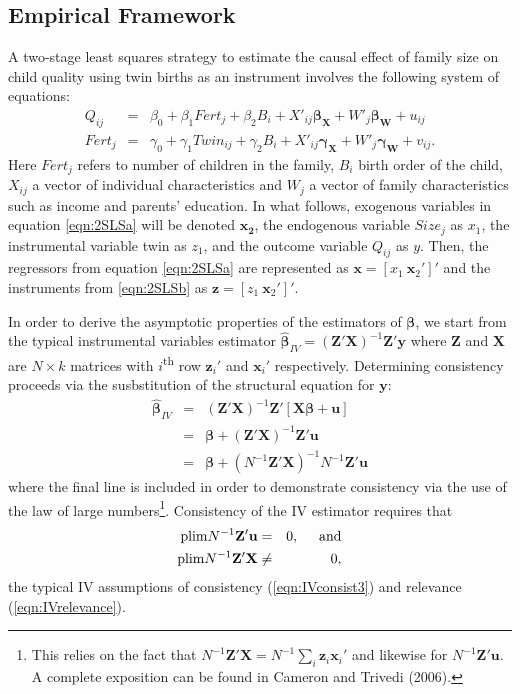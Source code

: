 \documentclass{article}[11pt,subeqn]
\newcommand{\vect}[1]{\mathbf{#1}}
\begin{document}
\begin{spacing}{1.5}
\section{Empirical Framework}
\label{scn:EF}
A two-stage least squares strategy to estimate the causal effect of family size on child quality using twin births as an instrument involves the following system of equations:
\begin{subequations}
\label{eqn:2SLS}
\begin{eqnarray}
\label{eqn:QQ}
Q_{ij}&=&\beta_0+\beta_1Fert_j+\beta_2B_{i}+X'_{ij}\vect{\beta_{\vect{X}}}+W'_j\vect{\beta_\vect{W}}+u_{ij} \label{eqn:2SLSa}\\
Fert_{j}&=&\gamma_0+\gamma_1Twin_{ij}+\gamma_2B_{i}+X'_{ij}\vect{\gamma_\vect{X}}+W'_j\vect{\gamma_\vect{W}}+v_{ij}. \label{eqn:2SLSb}
 \end{eqnarray}
\end{subequations}
Here $Fert_j$ refers to number of children in the family, $B_i$ birth order of the child, $X_{ij}$ a vector
of individual characteristics and $W_j$ a vector of family characteristics such as income and parents' education.
In what follows, exogenous variables in equation \ref{eqn:2SLSa} will be denoted $\mathbf{x_2}$, the
endogenous variable $Size_j$ as $x_1$, the instrumental variable twin as $z_1$, and the outcome variable
$Q_{ij}$ as $y$.  Then, the regressors from equation \ref{eqn:2SLSa} are represented as
$\vect{x}=[x_1\ \vect{x}_2']'$ and the instruments from \ref{eqn:2SLSb} as $\vect{z}=[z_1\ \vect{x}_2']'$.

In order to derive the asymptotic properties of the estimators of $\vect{\beta}$, we start from the typical instrumental variables estimator
$\vect{\hat{\beta}}_{IV}=(\vect{Z}'\vect{X})^{-1}\vect{Z}'\vect{y} $
where $\vect{Z}$ and $\vect{X}$ are $N \times k$ matrices with $i$\textsuperscript{th} row $\vect{z}_i'$ and $\vect{x}_i'$ respectively.  
Determining consistency proceeds via the susbstitution of the structural equation for $\vect{y}$:
\begin{eqnarray}
\label{eqn:IVderive}
\vect{\hat{\beta}}_{IV}&=&(\vect{Z}'\vect{X})^{-1}\vect{Z}'[\vect{X\beta}+\vect{u}] \nonumber\\
&=&\vect{\beta}+(\vect{Z}'\vect{X})^{-1}\vect{Z}'\vect{u}\nonumber\\
&=&\vect{\beta}+(N^{-1}\vect{Z}'\vect{X})^{-1}N^{-1}\vect{Z}'\vect{u}
\end{eqnarray}
where the final line is included in order to demonstrate consistency via the use of the law of large numbers\footnote{This relies
on the fact that $N^{-1}\vect{Z}'\vect{X}=N^{-1}\sum_i\vect{z}_i\vect{x}_i'$ and likewise for $N^{-1}\vect{Z}'\vect{u}$.  A
complete exposition can be found in Cameron and Trivedi (2006).}.  Consistency of the IV estimator requires that
\begin{eqnarray}
\mathrm{plim} N^{-1}\vect{Z'u}&=&0, \hspace{5mm}\mathrm{and} \label{eqn:IVconsist3}\\ 
\mathrm{plim} N^{-1}\vect{Z'X}&\neq&0, \label{eqn:IVrelevance}
\end{eqnarray}
the typical IV assumptions of consistency (\ref{eqn:IVconsist3}) and relevance (\ref{eqn:IVrelevance}).  


\end{spacing}
\end{document}
